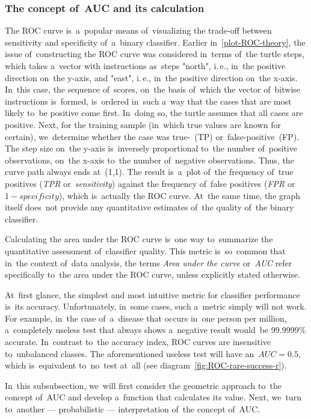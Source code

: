 \documentclass[]{scrreprt}
\begin{document}
\subsubsection{The concept of~AUC and its calculation}\label{calculate-AUC-theory}
The ROC curve is~a~popular means of~visualizing the trade-off between sensitivity and specificity of~a~binary classifier. Earlier in~\ref{plot-ROC-theory}, the issue of~constructing the ROC curve was considered in~terms of~the turtle steps, which takes a~vector with instructions as~steps "north", i.\,e., in~the positive direction on~the y-axis, and "east", i.\,e., in~the positive direction on~the x-axis. In~this case, the sequence of~scores, on~the basis of~which the vector of~bitwise instructions is~formed, is~ordered in~such a~way that the cases that are most likely to~be positive come first. In~doing so, the turtle assumes that all cases are positive. Next, for the training sample (in~which true values are known for certain), we~determine whether the case was true-~(TP) or~false-positive~(FP). The step size on~the y-axis is~inversely proportional to~the number of~positive observations, on~the x-axis to~the number of~negative observations. Thus, the curve path always ends at~(1,1). The result is~a~plot of~the frequency of~true positives (\textit{TPR} or~\textit{sensitivity}) against the frequency of~false positives (\textit{FPR} or~$1-specificity$), which is~actually the ROC curve. At~the same time, the graph itself does~not provide any quantitative estimates of~the quality of~the binary classifier.

Calculating the area under the ROC curve is~one way to~summarize the quantitative assessment of~classifier quality. This metric is~so~common that in~the context of~data analysis, the terms \emph{Area under the curve} or~\emph{AUC} refer specifically to~the area under the ROC curve, unless explicitly stated otherwise.

At~first glance, the simplest and most intuitive metric for classifier performance is~its accuracy. Unfortunately, in~some cases, such a~metric simply will not work. For example, in~the case of~a~disease that occurs in~one person per million, a~completely useless test that always shows a~negative result would~be 99.9999\% accurate. In~contrast to~the accuracy index, ROC curves are insensitive to~unbalanced classes. The aforementioned useless test will have an~$AUC=0.5$, which is~equivalent to~no~test at~all (see diagram~\ref{fig:ROC-rare-success-r}).

In~this subsubsection, we~will first consider the geometric approach to~the concept of~AUC and develop a~function that calculates its value. Next, we~turn to~another --- probabilistic --- interpretation of~the concept of~AUC.
\end{document}
